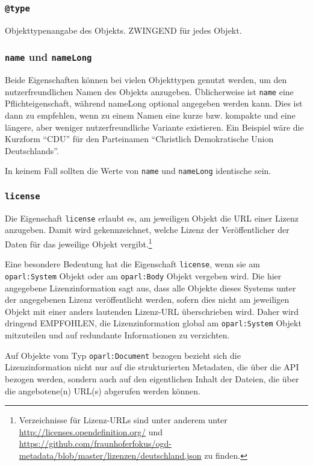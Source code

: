 \documentclass[,a4paper]{article}
\begin{document}
\subsubsection{\texttt{@type}}\label{type}

Objekttypenangabe des Objekts. ZWINGEND für jedes Objekt.

\subsubsection{\texttt{name} und
\texttt{nameLong}}\label{name-und-namelong}

Beide Eigenschaften können bei vielen Objekttypen genutzt werden, um den
nutzerfreundlichen Namen des Objekts anzugeben. Üblicherweise ist
\texttt{name} eine Pflichteigenschaft, während nameLong optional
angegeben werden kann. Dies ist dann zu empfehlen, wenn zu einem Namen
eine kurze bzw. kompakte und eine längere, aber weniger
nutzerfreundliche Variante existieren. Ein Beispiel wäre die Kurzform
``CDU'' für den Parteinamen ``Christlich Demokratische Union
Deutschlands''.

In keinem Fall sollten die Werte von \texttt{name} und \texttt{nameLong}
identische sein.

\subsubsection{\texttt{license}}\label{license}

Die Eigenschaft \texttt{license} erlaubt es, am jeweiligen Objekt die
URL einer Lizenz anzugeben. Damit wird gekennzeichnet, welche Lizenz der
Veröffentlicher der Daten für das jeweilige Objekt vergibt.\footnote{Verzeichnisse
  für Lizenz-URLs sind unter anderem unter
  \url{http://licenses.opendefinition.org/} und
  \url{https://github.com/fraunhoferfokus/ogd-metadata/blob/master/lizenzen/deutschland.json}
  zu finden.}

Eine besondere Bedeutung hat die Eigenschaft \texttt{license}, wenn sie
am \texttt{oparl:System} Objekt oder am \texttt{oparl:Body} Objekt
vergeben wird. Die hier angegebene Lizenzinformation sagt aus, dass alle
Objekte dieses Systems unter der angegebenen Lizenz veröffentlicht
werden, sofern dies nicht am jeweiligen Objekt mit einer anders
lautenden Lizenz-URL überschrieben wird. Daher wird dringend EMPFOHLEN,
die Lizenzinformation global am \texttt{oparl:System} Objekt mitzuteilen
und auf redundante Informationen zu verzichten.

Auf Objekte vom Typ \texttt{oparl:Document} bezogen bezieht sich die
Lizenzinformation nicht nur auf die strukturierten Metadaten, die über
die API bezogen werden, sondern auch auf den eigentlichen Inhalt der
Dateien, die über die angebotene(n) URL(s) abgerufen werden können.
\end{document}
